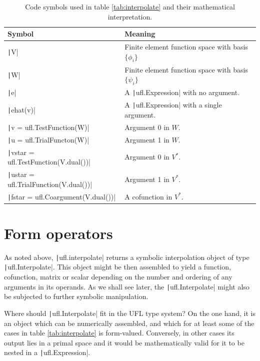 \documentclass[a4paper,11pt]{article}
\begin{document}
\begin{table}[htbp]
    \centering
    \begin{tabular}{ll}
    Symbol  & Meaning \\\hline
    \texttt|V| & Finite element function space with basis $\{\phi_i\}$ \\
    \texttt|W| & Finite element function space with basis $\{\psi_i\}$ \\
    \texttt|e| & A \texttt|ufl.Expression| with no argument.\\
    \texttt|ehat(v)| & A \texttt|ufl.Expression| with a single argument.\\ 
    \texttt|v = ufl.TestFunction(W)| & Argument 0 in $W$.\\
    \texttt|u = ufl.TrialFuncton(W)| & Argument 1 in $W$.\\
    \texttt|vstar = ufl.TestFunction(V.dual())| & Argument 0 in $V^*$.\\
    \texttt|ustar = ufl.TrialFunction(V.dual())| & Argument 1 in $V^*$.\\
    \texttt|fstar = ufl.Coargument(V.dual())| & A cofunction in $V^*$.
    \end{tabular}
    \caption{Code symbols used in table \ref{tab:interpolate} and their
    mathematical interpretation.}
    \label{tab:interp_symbols}
\end{table}

\section{Form operators}

As noted above, \texttt|ufl.interpolate| returns a symbolic
interpolation object of type \texttt|ufl.Interpolate|. This object
might be then assembled to yield a function, cofunction, matrix or scalar
depending on the number and ordering of any arguments in its operands. As we
shall see later, the  \texttt|ufl.Interpolate| might also be
subjected to further symbolic manipulation.

Where should \texttt|ufl.Interpolate| fit in the UFL type system?
On the one hand, it is an object which can be numerically assembled, and which
for at least some of the cases in table \ref{tab:interpolate} is form-valued.
Conversely, in other cases its output lies in a primal space and it would be
mathematically valid for it to be nested in a
\texttt|ufl.Expression|.
\end{document}
